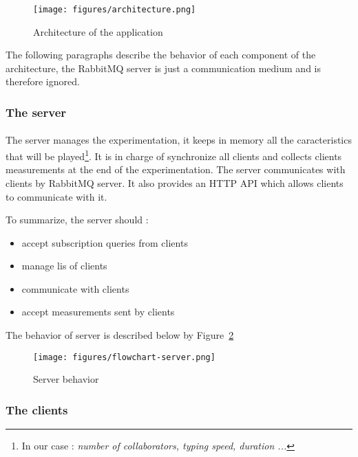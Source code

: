 \documentclass[twoside,twocolumn]{article}
\begin{document}
\begin{figure}[h!]
  \centering
  \texttt{[image: figures/architecture.png]}
  \caption{Architecture of the application}
  \label{fig:archi}
\end{figure}

\noindent The following paragraphs describe the behavior of each component of the architecture, the RabbitMQ server is just a communication medium and is therefore ignored.

\subsubsection{The server}
\paragraph{}
The server manages the experimentation, it keeps in memory all the caracteristics that will be played\footnote{In our case : \it{number of collaborators, typing speed, duration ...}}.
It is in charge of synchronize all clients and collects clients
measurements at the end of the experimentation. The server communicates with clients by RabbitMQ server. It also provides an HTTP API which allows clients to communicate with it.

\noindent To summarize, the server should :
\begin{itemize}
  \item accept subscription queries from clients
  \item manage lis of clients
  \item communicate with clients
  \item accept measurements sent by clients
\end{itemize}

The behavior of server is described below by Figure~\ref{fig:serv-behavior}

\begin{figure}[h!]
  \centering
  \texttt{[image: figures/flowchart-server.png]}
  \caption{Server behavior}
  \label{fig:serv-behavior}
\end{figure}

\subsubsection{The clients}
\end{document}

